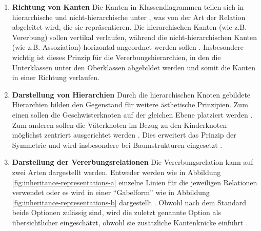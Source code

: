 \begin{enumerate}[label={A.\arabic*}, resume]
    \item \textbf{Richtung von Kanten} Die Kanten in Klassendiagrammen teilen sich in hierarchische und nicht-hierarchische unter \cite{Eichelberger05Aesthetics}, was von der Art der Relation abgeleitet wird, die sie repräsentieren. Die hierarchischen Kanten (wie z.B. Vererbung) sollen vertikal verlaufen, während die nicht-hierarchischen Kanten (wie z.B. Assoziation) horizontal angeordnet werden sollen \cite{EichelbergerSchmid09Guidelines, Ambler05The-Elements}. Insbesondere wichtig ist dieses Prinzip für die Vererbungshierarchien, in den die Unterklassen unter den Oberklassen abgebildet werden und somit die Kanten in einer Richtung verlaufen.
    \item \textbf{Darstellung von Hierarchien} Durch die hierarchischen Knoten gebildete Hierarchien bilden den Gegenstand für weitere ästhetische Prinzipien. Zum einen sollen die Geschwisterknoten auf der gleichen Ebene platziert werden \cite{Siebenhaller03Automatisches}. Zum anderen sollen die Väterknoten im Bezug zu den Kinderknoten möglichst zentriert ausgerichtet werden \cite{EichelbergerSchmid09Guidelines, Siebenhaller03Automatisches}. Dies erweitert das Prinzip der Symmetrie \cite{EichelbergerSchmid09Guidelines} und wird insbesondere bei Baumstrukturen eingesetzt \cite{Siebenhaller03Automatisches}.
    \item \textbf{Darstellung der Vererbungsrelationen} Die Vererbungsrelation kann auf zwei Arten dargestellt werden. Entweder werden wie in Abbildung \ref{fig:inheritance-representations-a} einzelne Linien für die jeweiligen Relationen verwendet oder es wird in einer \enquote{Gabelform} wie in Abbildung \ref{fig:inheritance-representations-b} dargestellt \cite{Siebenhaller03Automatisches}. Obwohl nach dem Standard beide Optionen zulässig sind, wird die zuletzt genannte Option als übersichtlicher eingeschätzt, obwohl sie zusätzliche Kantenknicke einführt \cite{EichelbergerSchmid09Guidelines, Siebenhaller03Automatisches}.


\end{enumerate}
